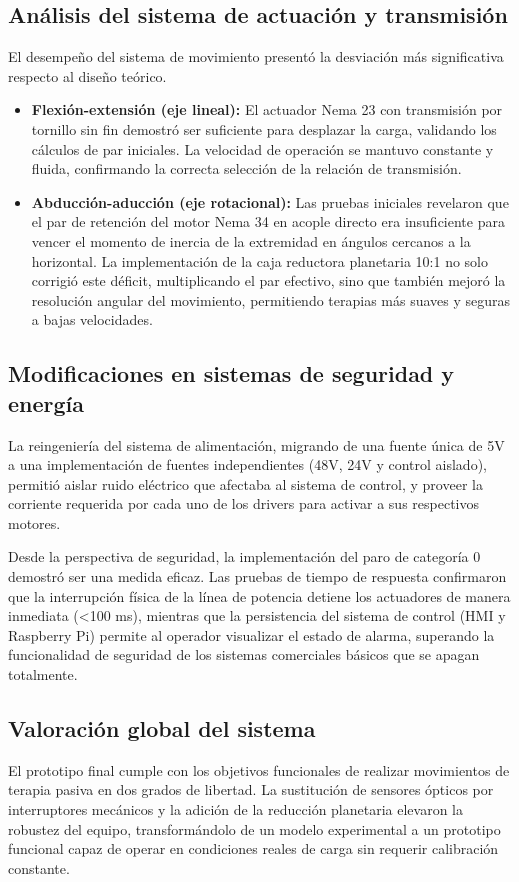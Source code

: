 \subsection{Análisis del sistema de actuación y transmisión}
El desempeño del sistema de movimiento presentó la desviación más significativa respecto al diseño teórico.

\begin{itemize}
    \item \textbf{Flexión-extensión (eje lineal):} El actuador Nema 23 con transmisión por tornillo sin fin demostró ser suficiente para desplazar la carga, validando los cálculos de par iniciales. La velocidad de operación se mantuvo constante y fluida, confirmando la correcta selección de la relación de transmisión.
    
    \item \textbf{Abducción-aducción (eje rotacional):} Las pruebas iniciales revelaron que el par de retención del motor Nema 34 en acople directo era insuficiente para vencer el momento de inercia de la extremidad en ángulos cercanos a la horizontal. La implementación de la caja reductora planetaria 10:1 no solo corrigió este déficit, multiplicando el par efectivo, sino que también mejoró la resolución angular del movimiento, permitiendo terapias más suaves y seguras a bajas velocidades.
\end{itemize}

\subsection{Modificaciones en sistemas de seguridad y energía}
La reingeniería del sistema de alimentación, migrando de una fuente única de 5V a una implementación de fuentes independientes (48V, 24V y control aislado), permitió aislar ruido eléctrico que afectaba al sistema de control, y proveer la corriente requerida por cada uno de los drivers para activar a sus respectivos motores.

Desde la perspectiva de seguridad, la implementación del paro de categoría 0 demostró ser una medida eficaz. Las pruebas de tiempo de respuesta confirmaron que la interrupción física de la línea de potencia detiene los actuadores de manera inmediata (<100 ms), mientras que la persistencia del sistema de control (HMI y Raspberry Pi) permite al operador visualizar el estado de alarma, superando la funcionalidad de seguridad de los sistemas comerciales básicos que se apagan totalmente.

\subsection{Valoración global del sistema}
El prototipo final cumple con los objetivos funcionales de realizar movimientos de terapia pasiva en dos grados de libertad. La sustitución de sensores ópticos por interruptores mecánicos y la adición de la reducción planetaria elevaron la robustez del equipo, transformándolo de un modelo experimental a un prototipo funcional capaz de operar en condiciones reales de carga sin requerir calibración constante.
